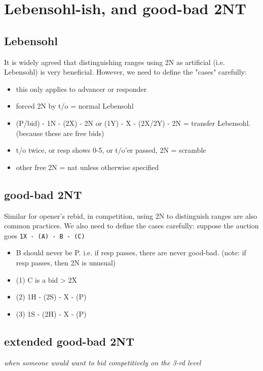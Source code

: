 \section{Lebensohl-ish, and good-bad 2NT}

\subsection{Lebensohl}

It is widely agreed that distinguishing ranges using 2N as artificial (i.e. Lebensohl) is very beneficial.
However, we need to define the "cases" carefully:

\begin{itemize}
    \setlength\itemsep{0pt}
    \item this only applies to advancer or responder
    \item forced 2N by t/o = normal Lebensohl
    \item (P/bid) - 1N - (2X) - 2N or (1Y) - X - (2X/2Y) - 2N = transfer Lebensohl. (because these are free bids)
    \item t/o twice, or resp shows 0-5, or t/o'er passed, 2N = scramble
    \item other free 2N = nat unless otherwise specified
\end{itemize}


\subsection{good-bad 2NT}

Similar for opener's rebid, in competition, using 2N to distinguish ranges are also common practices. 
We also need to define the cases carefully: suppose the auction goes \texttt{1X - (A) - B - (C)}

\begin{itemize}
    \setlength\itemsep{0pt}
    \item B should never be P. i.e. if resp passes, there are never good-bad. (note: if resp passes, then 2N is unusual)
    \item (1) C is a bid > 2X
    \item (2) 1H - (2S) - X - (P)
    \item (3) 1S - (2H) - X - (P)
\end{itemize}


\subsection{extended good-bad 2NT}

\textit{when someone would want to bid competitively on the 3-rd level}

